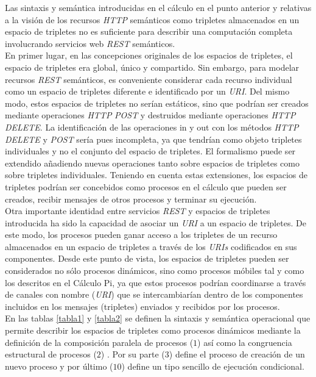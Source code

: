 Las sintaxis y sem\'antica introducidas en el c\'alculo en el punto anterior y relativas a la visi\'on de los recursos \textit{HTTP} sem\'anticos como tripletes almacenados en un espacio de tripletes no es suficiente para describir una computaci\'on completa involucrando servicios web \textit{REST} sem\'anticos.\\
En primer lugar, en las concepciones originales de los espacios de tripletes, el espacio de tripletes era global, \'unico y compartido. Sin embargo, para modelar recursos \textit{REST} sem\'anticos, es conveniente considerar cada recurso individual como un espacio de tripletes diferente e identificado por un \textit{URI}. Del mismo modo, estos espacios de tripletes no ser\'ian est\'aticos, sino que podr\'ian ser creados mediante operaciones \textit{HTTP} \textit{POST} y destruidos mediante operaciones \textit{HTTP} \textit{DELETE}. La identificaci\'on de las operaciones in y out con los m\'etodos \textit{HTTP} \textit{DELETE} y \textit{POST} ser\'ia pues incompleta, ya que tendr\'ian como objeto tripletes individuales y no el conjunto del espacio de tripletes. El formalismo puede ser extendido \cite{simperl2007coordination} a\~nadiendo nuevas operaciones tanto sobre espacios de tripletes como sobre tripletes individuales. Teniendo en cuenta estas extensiones, los espacios de tripletes podr\'ian ser concebidos como procesos en el c\'alculo que pueden ser creados, recibir mensajes de otros procesos y terminar su ejecuci\'on.\\
Otra importante identidad entre servicios \textit{REST} y espacios de tripletes introducida ha sido la capacidad de asociar un \textit{URI} a un espacio de tripletes. De este modo, los procesos pueden ganar acceso a los tripletes de un recurso almacenados en un espacio de tripletes a trav\'es de los \textit{URIs} codificados en sus componentes. Desde este punto de vista, los espacios de tripletes pueden ser considerados no s\'olo procesos din\'amicos, sino como procesos m\'obiles tal y como los descritos en el C\'alculo Pi, ya que estos procesos podr\'ian coordinarse a trav\'es de canales con nombre (\textit{URI}) que se intercambiar\'ian dentro de los componentes incluidos en los mensajes (tripletes) enviados y recibidos por los procesos.\\
En las tablas \ref{tabla1} y \ref{tabla2} se definen la sintaxis y sem\'antica operacional que permite describir los espacios de tripletes como procesos din\'amicos mediante la definici\'on de la composici\'on paralela de procesos ($1$) as\'i como la congruencia estructural de procesos ($2$) \cite{pi_calculus}. Por su parte ($3$) define el proceso de creaci\'on de un nuevo proceso y por \'ultimo ($10$) define un tipo sencillo de ejecuci\'on condicional.\\
